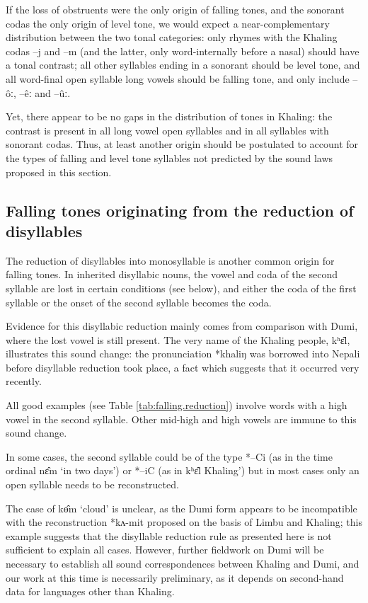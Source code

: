 \documentclass[oldfontcommands,oneside,a4paper,11pt]{article}
\newcommand{\ipa}[1]{{\phon \mbox{#1}}} %
\begin{document}
If the loss of obstruents were the only origin of falling tones, and the sonorant codas the only origin of level tone, we would expect a near-complementary distribution between the two tonal categories: only rhymes with the Khaling codas \ipa{--j} and \ipa{--m} (and the latter, only word-internally before a nasal) should have a tonal contrast; all other syllables ending in a sonorant should be level tone, and all word-final open syllable long vowels should be falling tone, and only include \ipa{--ôː}, \ipa{--êː} and \ipa{--ûː}.

Yet, there appear to be no gaps in the distribution of tones in Khaling: the contrast is present in all long vowel open syllables and in all syllables with sonorant codas. Thus, at least another origin should be postulated to account for the types of falling and level tone syllables not predicted by the sound laws proposed in this section.

\subsection{Falling tones originating from the reduction of disyllables} \label{sec:disyll}
The reduction of disyllables into monosyllable is another common origin for falling tones. In inherited disyllabic nouns, the vowel and coda of the second syllable are   lost in certain conditions (see below), and either the coda of the first syllable or the onset of the second syllable becomes the coda.

Evidence for this disyllabic reduction mainly comes from comparison with Dumi, where the lost vowel is still present. The very name of the Khaling people, \ipa{kʰɛ‍̂l}, illustrates this sound change: the pronunciation \ipa{*khaliŋ}		was borrowed into Nepali before disyllable reduction took place, a fact which suggests that it occurred very recently.


All good examples (see Table \ref{tab:falling.reduction}) involve words with a high vowel in the second syllable. Other mid-high and high vowels are immune to this sound change.

In some cases, the second syllable could be of the type *--Ci (as in the time ordinal \ipa{nɛ̂m}  `in two days') or *--iC (as in \ipa{kʰɛ‍̂l}  Khaling') but in most cases only an open syllable  needs to be reconstructed.

The case of \ipa{kɵ̂m}	`cloud' is unclear, as the Dumi form appears to be incompatible with the reconstruction \ipa{*kʌ-mit} proposed on the basis of Limbu and Khaling; this example suggests that the disyllable reduction rule as presented here is not sufficient to explain all cases. However, further fieldwork on Dumi will be necessary to establish all sound  correspondences between Khaling and Dumi, and our work at this time is necessarily preliminary, as it depends on second-hand data for languages other than Khaling.
\end{document}
